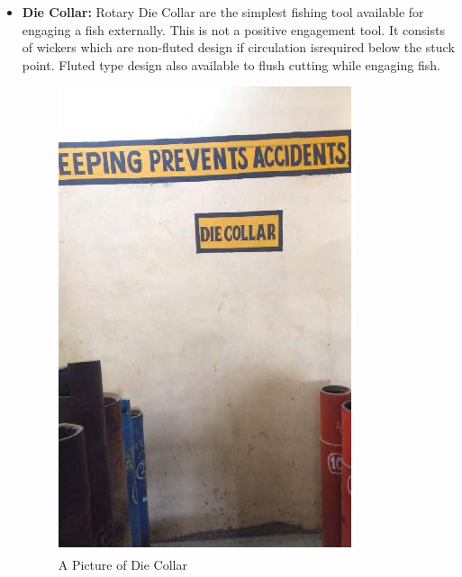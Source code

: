 \begin{itemize}
\item \textbf{Die Collar:} Rotary Die Collar are the simplest fishing tool available
for engaging a fish externally. This is not a positive engagement tool.
It consists of wickers which are non-fluted design if circulation isrequired below the stuck point. Fluted type design also available to
flush cutting while engaging fish.

\begin{figure}[t]
\includegraphics[scale=0.3]{images/Die_collar}
\centering 
\caption{A Picture of Die Collar}
\end{figure}

\end{itemize}



